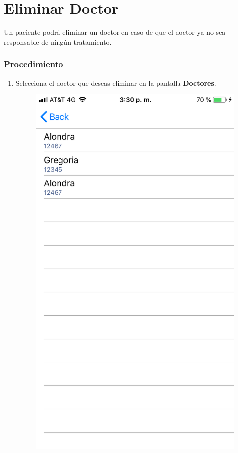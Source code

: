 \section{Eliminar Doctor}

Un paciente podrá eliminar un doctor en caso de que el doctor ya no sea responsable de ningún tratamiento.

\subsubsection{Procedimiento}
\begin{enumerate}
	
	\item Selecciona el doctor que deseas eliminar en la pantalla \textbf{Doctores}.
	
	\begin{figure}[!htbp]			
		\hypertarget{fig:Doctores2}{\hspace{1pt}}
		\begin{center}
			\includegraphics[height=0.4\textheight]{Paciente/EliminarDoctor/images/Doctores}

\end{center}
\end{figure}
\end{enumerate}
